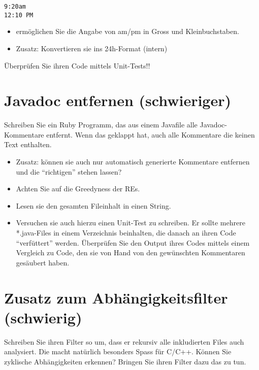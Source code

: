\documentclass[a4paper,11pt,oneside]{scrbook}
\begin{document}
\begin{lstlisting}
9:20am
12:10 PM
\end{lstlisting}

\begin{itemize}
	\item ermöglichen Sie die Angabe von am/pm in Gross und Kleinbuchstaben.
	\item Zusatz: Konvertieren sie ins 24h-Format (intern)
\end{itemize}

Überprüfen Sie ihren Code mittels Unit-Tests!!

\section{Javadoc entfernen (schwieriger)} %
\label{sec:javadoc_entfernen}
Schreiben Sie ein Ruby Programm, das aus einem Javafile alle Javadoc-Kommentare entfernt. Wenn das geklappt hat, auch alle Kommentare die keinen Text enthalten.
\begin{itemize}
	\item Zusatz: können sie auch nur automatisch generierte Kommentare entfernen und die “richtigen” stehen lassen?
	\item Achten Sie auf die Greedyness der REs.
	\item Lesen sie den gesamten Fileinhalt in einen String.
	\item Versuchen sie auch hierzu einen Unit-Test zu schreiben. Er sollte mehrere *.java-Files in einem Verzeichnis beinhalten, die danach an ihren Code “verfüttert” werden. Überprüfen Sie den Output ihres Codes mittels einem Vergleich zu Code, den sie von Hand von den gewünschten Kommentaren gesäubert haben.
\end{itemize}

\section{Zusatz zum Abhängigkeitsfilter (schwierig)} %
\label{sec:Zusatz zum Abhängigkeitsfilter}
Schreiben Sie ihren Filter so um, dass er rekursiv alle inkludierten Files auch analysiert. Die macht natürlich besonders Spass für C/C++.
Können Sie zyklische Abhängigkeiten erkennen? Bringen Sie ihren Filter dazu das zu tun.


\end{document}
